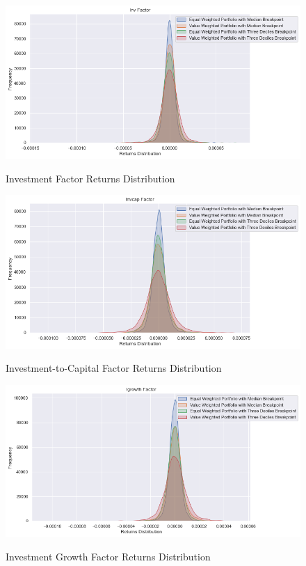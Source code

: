 \begin{figure}[H]
	\caption{Investment Factor Returns Distribution}
	\centering
	\includegraphics[scale=.63]{../../output/figures/inv.png}
	\label{fig:inv}
\end{figure}

\begin{figure}[H]
	\caption{Investment-to-Capital Factor Returns Distribution}
	\centering
	\includegraphics[scale=.63]{../../output/figures/invcap.png}
	\label{fig:invcap}
\end{figure}

\begin{figure}[H]
	\caption{Investment Growth Factor Returns Distribution}
	\centering
	\includegraphics[scale=.63]{../../output/figures/igrowth.png}
	\label{fig:igrowth}
\end{figure}

